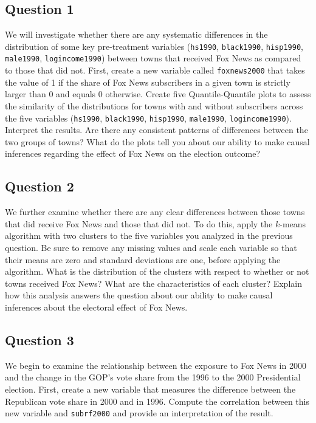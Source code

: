 \documentclass[]{article}
\begin{document}
\subsection{Question 1}\label{question-1}

We will investigate whether there are any systematic differences in the
distribution of some key pre-treatment variables (\texttt{hs1990},
\texttt{black1990}, \texttt{hisp1990}, \texttt{male1990},
\texttt{logincome1990}) between towns that received Fox News as compared
to those that did not. First, create a new variable called
\texttt{foxnews2000} that takes the value of 1 if the share of Fox News
subscribers in a given town is strictly larger than 0 and equals 0
otherwise. Create five Quantile-Quantile plots to assess the similarity
of the distributions for towns with and without subscribers across the
five variables (\texttt{hs1990}, \texttt{black1990}, \texttt{hisp1990},
\texttt{male1990}, \texttt{logincome1990}). Interpret the results. Are
there any consistent patterns of differences between the two groups of
towns? What do the plots tell you about our ability to make causal
inferences regarding the effect of Fox News on the election outcome?

\subsection{Question 2}\label{question-2}

We further examine whether there are any clear differences between those
towns that did receive Fox News and those that did not. To do this,
apply the $k$-means algorithm with two clusters to the five variables
you analyzed in the previous question. Be sure to remove any missing
values and scale each variable so that their means are zero and standard
deviations are one, before applying the algorithm. What is the
distribution of the clusters with respect to whether or not towns
received Fox News? What are the characteristics of each cluster? Explain
how this analysis answers the question about our ability to make causal
inferences about the electoral effect of Fox News.

\subsection{Question 3}\label{question-3}

We begin to examine the relationship between the exposure to Fox News in
2000 and the change in the GOP's vote share from the 1996 to the 2000
Presidential election. First, create a new variable that measures the
difference between the Republican vote share in 2000 and in 1996.
Compute the correlation between this new variable and \texttt{subrf2000}
and provide an interpretation of the result.
\end{document}
